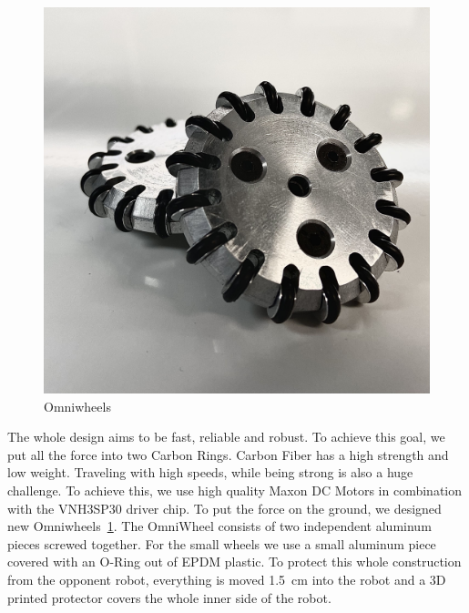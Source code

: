 \documentclass{scrartcl}
\begin{document}
\begin{figure}
    \centering
    \includegraphics[width=1\linewidth]{img/inv/OmniWheel.jpg}
    \caption{Omniwheels}
    \label{fig:OmniWheels}
\end{figure}

The whole design aims to be fast, reliable and robust. To achieve this goal, we put all the force
into two Carbon Rings. Carbon Fiber has a high strength and low weight.
\newline
Traveling with high speeds, while being strong is also a huge challenge. To achieve this, we use high quality
Maxon DC Motors in combination with the VNH3SP30 driver chip. To put the force on the ground, we designed
new Omniwheels~\ref{fig:OmniWheels}.
The OmniWheel consists of two independent aluminum pieces screwed together. For the small wheels we use a small
aluminum piece covered with an O-Ring out of EPDM plastic.
\newline
To protect this whole construction from the opponent robot, everything is moved 1.5 cm into the robot and a 3D
printed protector covers the whole inner side of the robot.
\newpage
\end{document}
